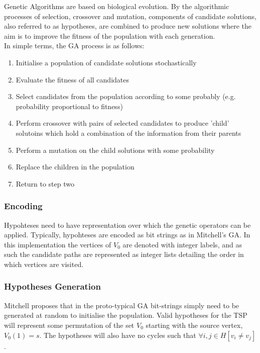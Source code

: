 \documentclass[
	a4paper, %
	10pt, %
	unnumberedsections, %
	twoside, %
]{LTJournalArticle}
\begin{document}
Genetic Algorithms are based on biological evolution. By the algorithmic processes of selection, crossover and mutation, components of candidate solutions, also referred to as hypotheses, are combined to produce new solutions where the aim is to improve the fitness of the population with each generation. \\

In simple terms, the GA process is as follows: 
\begin{enumerate}
	\item Initialise a population of candidate solutions stochastically 
	\item Evaluate the fitness of all candidates 
	\item Select candidates from the population according to some probably (e.g. probability proportional to fitness) 
	\item Perform crossover with pairs of selected candidates to produce 'child' solutoins which hold a combination of the information from their parents 
	\item Perform a mutation on the child solutions with some probability
	\item Replace the children in the population 
	\item Return to step two 
\end{enumerate} 

\subsubsection{Encoding} Hypohteses need to have representation over which the genetic operators can be applied. Typically, hypohteses are encoded as bit strings \cite{mitchell:97} as in Mitchell's GA. In this implementation the vertices of \(V_{0}\) are denoted with integer labels, and as such the candidate paths are represented as integer lists detailing the order in which vertices are visited. \\

\subsubsection{Hypotheses Generation} Mitchell proposes that in the proto-typical GA bit-strings simply need to be generated at random to initialise the population. Valid hypotheses for the TSP will represent some permutation of the set \(V_{0}\) starting with the source vertex, \(V_{0}(1) = s\). The hypotheses will also have no cycles such that \(\forall i, j \in H [v_{i} \neq v_{j}] \). 
\end{document}
